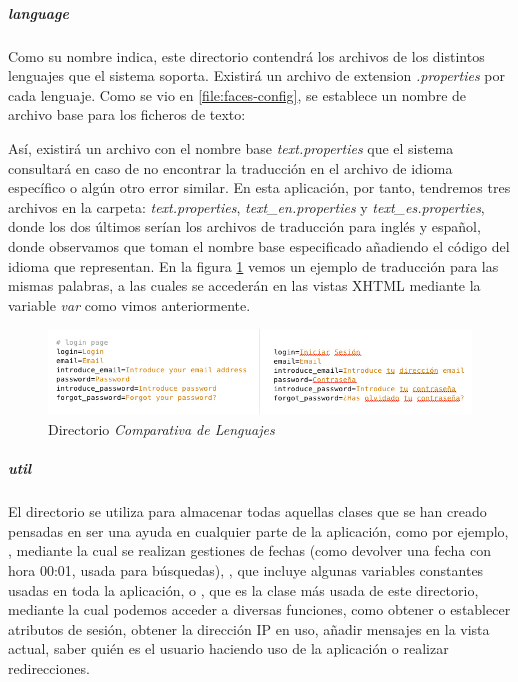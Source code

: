\subparagraph{\textit{language}} \label{lenguajes}

Como su nombre indica, este directorio contendrá los archivos de los distintos lenguajes que el sistema soporta. Existirá un archivo de extension \textit{.properties} por cada lenguaje. Como se vio en \ref{file:faces-config}, se establece un nombre de archivo base para los ficheros de texto:



Así, existirá un archivo con el nombre base \textit{text.properties} que el sistema consultará en caso de no encontrar la traducción en el archivo de idioma específico o algún otro error similar. En esta aplicación, por tanto, tendremos tres archivos en la carpeta: \textit{text.properties}, \textit{text\_en.properties} y \textit{text\_es.properties}, donde los dos últimos serían los archivos de traducción para inglés y español, donde observamos que toman el nombre base especificado añadiendo el código del idioma que representan. En la figura \ref{fig:comparacion-lenguajes} vemos un ejemplo de traducción para las mismas palabras, a las cuales se accederán en las vistas XHTML mediante la variable \textit{var} como vimos anteriormente.

\begin{figure}
\centering
  \includegraphics[scale=.60]{img/comparacion-lenguajes.jpg}
  \caption{Directorio \textit{Comparativa de Lenguajes}}
  \label{fig:comparacion-lenguajes}
\end{figure}


\subparagraph{\textit{util}}

El directorio  se utiliza para almacenar todas aquellas clases que se han creado pensadas en ser una ayuda en cualquier parte de la aplicación, como por ejemplo, , mediante la cual se realizan gestiones de fechas (como devolver una fecha con hora 00:01, usada para búsquedas), , que incluye algunas variables constantes usadas en toda la aplicación, o , que es la clase más usada de este directorio, mediante la cual podemos acceder a diversas funciones, como obtener o establecer atributos de sesión, obtener la dirección IP en uso, añadir mensajes en la vista actual, saber quién es el usuario haciendo uso de la aplicación o realizar redirecciones.\\
\\

